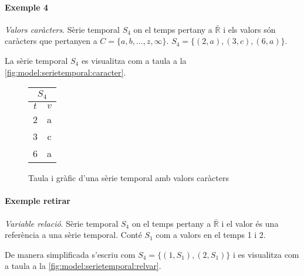 \paragraph{Exemple 4} \emph{Valors caràcters}.
Sèrie temporal $S_4$ on el temps pertany a $\bar{\mathbb{R}}$ i els valors són caràcters que pertanyen a $C=\{a,b,\dotsc,z,\infty\}$. $S_4 = \{ (2,a), (3,c), (6,a) \}$.

La sèrie temporal $S_4$ es visualitza com a taula a la \autoref{fig:model:serietemporal:caracter}.

\begin{figure}[tp]
  \centering
  \begin{tabular}[c]{|c|c|}
    \multicolumn{2}{c}{$S_4$} \\ \hline
    $t$  & $v$ \\ \hline
    2  & a \\
    3  & c \\
    6  & a \\ \hline
  \end{tabular} \qquad
  \caption{Taula i gràfic d'una sèrie temporal amb valors caràcters}
  \label{fig:model:serietemporal:caracter}
\end{figure}





\paragraph{Exemple retirar} \emph{Variable relació}.
Sèrie temporal $S_4$ on el temps pertany a $\bar{\mathbb{R}}$ i el valor és una referència a una sèrie temporal. Conté $S_1$ com a valors en el temps 1 i 2. 

De manera simplificada s'escriu com
$S_4 =  \{ (1,S_1) , (2,S_1) \}$ 
i es visualitza com a taula a la \autoref{fig:model:serietemporal:relvar}.

